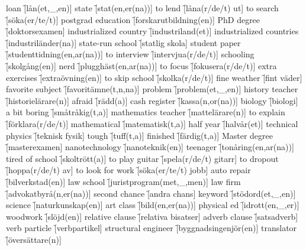 \begin{questions}
\begin{multicols}{2}
        \question loan \f[lån(et,\_,en)]
        \question state \f[stat(en,er(na))]
        \question to lend \f[låna(r/de/t) ut]
        \question to search \f[söka(er/te/t)]
        \question postgrad education \f[forskarutbildning(en)]
        \question PhD degree \f[doktorsexamen]
        \question industrialized country \f[industriland(et)]
        \question industrialized countries \f[industriländer(na)]
        \question state-run school \f[statlig skola]
        \question student paper \f[studenttidning(en,ar(na))]
        \question to interview \f[intervjua(r/de/t)]
        \question schooling \f[skolgång(en)]
        \question nerd \f[plugghäst(en,ar(na))]
        \question to focus \f[fokusera(r/de/t)]
        \question extra exercises \f[extraövning(en)]
        \question to skip school \f[skolka(r/de/t)]
        \question fine weather \f[fint väder]
        \question favorite subject \f[favoritämne(t,n,na)]
        \question problem \f[problem(et,\_,en)]
        \question history teacher \f[historielärare(n)]
        \question afraid \f[rädd(a)]
        \question cash register \f[kassa(n,or(na))]
        \question biology \f[biologi]
        \question a bit boring \f[småtråkig(t,a)]
        \question mathematics teacher \f[mattelärare(n)]
        \question to explain \f[förklara(r/de/t)]
        \question mathematical \f[matematisk(t,a)]
        \question half year \f[halvår(et)]
        \question technical physics \f[teknisk fysik]
        \question tough \f[tuff(t,a)]
        \question finished \f[färdig(t,a)]
        \question Master degree \f[masterexamen]
        \question nanotechnology \f[nanoteknik(en)]
        \question teenager \f[tonåring(en,ar(na))]
        \question tired of school \f[skoltrött(a)]
        \question to play guitar \f[spela(r/de/t) gitarr]
        \question to dropout \f[hoppa(r/de/t) av]
        \question to look for work \f[söka(er/te/t) jobb]
        \question auto repair \f[bilverkstad(en)]
        \question law school \f[juristprogram(met,\_,men)]
        \question law firm \f[advokatbyrå(n,er(na))]
        \question second chance \f[andra chans]
        \question keyword \f[stödord(et,\_,en)]
        \question science \f[naturkunskap(en)]
        \question art class \f[bild(en,er(na))]
        \question physical ed \f[idrott(en,\_,er)]
        \question woodwork \f[slöjd(en)]
        \question relative clause \f[relativa bisatser]
        \question adverb clause \f[satsadverb]
        \question verb particle \f[verbpartikel]
        \question structural engineer \f[byggnadsingenjör(en)]
        \question translator \f[översättare(n)]

\end{multicols}
\end{questions}
